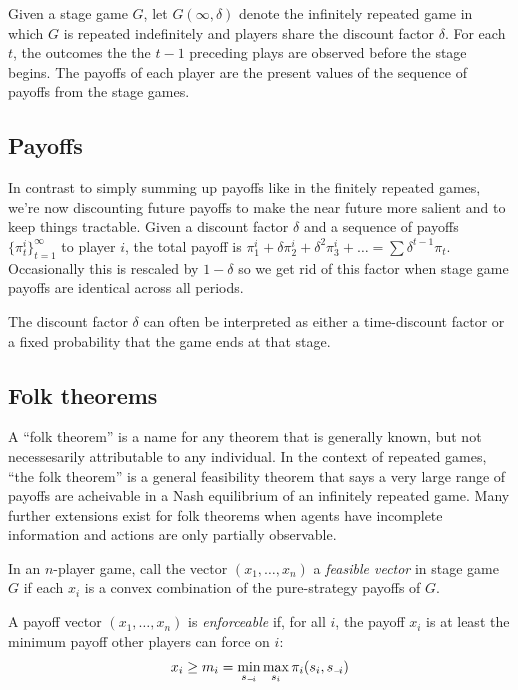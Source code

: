 \documentclass[10pt]{article}
\begin{document}
\begin{spacing}{1.0}
\begin{definition}
  Given a stage game $G$, let $G(\infty, \delta)$ denote
  the infinitely repeated game in which $G$ is repeated
  indefinitely and players share the discount factor
  $\delta$. For each $t$, the outcomes the the $t-1$
  preceding plays are observed before the stage
  begins. The payoffs of each player are the present
  values of the sequence of payoffs from the stage games.
\end{definition}

\subsection{Payoffs}
 In contrast to simply summing up payoffs like in the
 finitely repeated games, we're now discounting future
 payoffs to make the near future more salient and to keep
 things tractable. Given a discount factor $\delta$ and a
 sequence of payoffs $\{\pi_t^i\}_{t=1}^\infty$ to player
 $i$, the total payoff is
 $\pi_1^i+\delta\pi_2^i+\delta^2\pi_3^i+\ldots = \sum
 \delta^{t-1} \pi_t$. Occasionally this is rescaled by
 $1-\delta$ so we get rid of this factor when stage game
 payoffs are identical across all periods.

 The discount factor $\delta$ can often be interpreted as either a
time-discount factor or a fixed probability that the game ends at that stage.


\subsection{Folk theorems}

A ``folk theorem'' is a name for any theorem that is generally known, but
not necessesarily attributable to any individual. In the context of
repeated games, ``the folk theorem'' is a general feasibility theorem that
says a very large range of payoffs are acheivable in a Nash equilibrium of
an infinitely repeated game. Many further extensions exist for folk
theorems when agents have incomplete information and actions are only
partially observable.

\begin{definition}
  In an $n$-player game, call the vector $(x_1,\ldots,
  x_n)$ a \emph{feasible vector} in stage game $G$ if each $x_i$
  is a convex combination of the pure-strategy payoffs of $G$.
\end{definition}

\begin{definition}
  A payoff vector $(x_1, \ldots, x_n)$ is \emph{enforceable} if, for all $i$, the
  payoff $x_i$ is at least the minimum payoff other players can force on $i$:
  \begin{align*}
    x_i \ge m_i = \min_{s_{{\scriptscriptstyle-}\!i}} \max_{s_i} \pi_i(s_i, s_{{\scriptscriptstyle-}\!i})
  \end{align*}
\end{definition}


\end{spacing}
\end{document}
